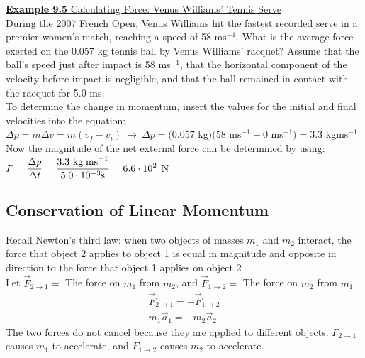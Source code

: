 \documentclass[a4paper]{article}
\let\bf\textbf
\begin{document}
\begin{shaded}
    \underline{\bf{Example 9.5} Calculating Force: Venus Williams' Tennis Serve}
    \vspace{2mm}\\
    During the 2007 French Open, Venus Williams hit the fastest recorded serve in a premier women's match, reaching a speed of 58 ms$^{-1}$. What is the average force exerted on the 0.057 kg tennis ball by Venus Williams' racquet? Assume that the ball's speed just after impact is 58 ms$^{-1}$, that the horizontal component of the velocity before impact is negligible, and that the ball remained in contact with the racquet for 5.0 ms.
    \vspace{1mm}\\
    To determine the change in momentum, insert the values for the initial and final velocities into the equation:\\
    $\Delta p = m\Delta v = m(v_f - v_i) \ \to \ \Delta p = (0.057$ kg$)(58$ ms$^{-1} - 0$ ms$^{-1}) = 3.3$ kg\;ms$^{-1}$\\
    Now the magnitude of the net external force can be determined by using:\\
    $\displaystyle F = \frac{\Delta p}{\Delta t} = \frac{3.3\text{ kg\;ms}^{-1}}{5.0 \cdot 10^{-3}\text{s}} = 6.6 \cdot 10^2$ N
\end{shaded}

\newpage
\subsection{Conservation of Linear Momentum}
Recall Newton's third law: when two objects of masses $m_1$ and $m_2$ interact, the force that object 2 applies to object 1 is equal in magnitude and opposite in direction to the force that object 1 applies on object 2
\vspace{1mm}\\
Let $\vec{F}_{2 \to 1} =$ The force on $m_1$ from $m_2$, and $\vec{F}_{1 \to 2} =$ The force on $m_2$ from $m_1$
\begin{equation}
    \begin{aligned}
        \vec{F}_{2 \to 1} = -\vec{F}_{1 \to 2}\\
        m_1\vec{a}_1 = -m_2\vec{a}_2
    \end{aligned}
\end{equation}
The two forces do not cancel because they are applied to different objects. $F_{2 \to 1}$ causes $m_1$ to accelerate, and $F_{1 \to 2}$ causes $m_2$ to accelerate. 
\end{document}
